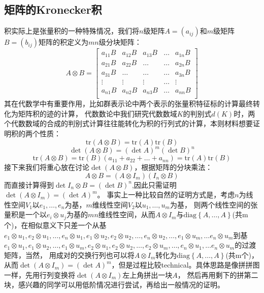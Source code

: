 \documentclass[a4paper,12pt]{ctexart}
\newenvironment{prooff}{{\noindent\it\textcolor{cyan!40!black}{Proof}:}\quad}{\par}
\begin{document}
\subsection{矩阵的Kronecker积}
积实际上是张量积的一种特殊情况，我们将$n$级矩阵$A=(a_{ij})$和$m$级矩阵$B=(b_{ij})$矩阵的积定义为$mn$级分块矩阵：
\begin{equation*}
    A\otimes B=\begin{bmatrix}
        a_{11}B & a_{12}B & a_{13}B & \dots & a_{1n}B \\
        a_{21}B & a_{22}B & \dots   & \dots & a_{2n}B \\
        a_{31}B & \dots   & \dots   & \dots & a_{3n}B \\
        \vdots  & \vdots  & \vdots  & \dots & \vdots  \\
        a_{n1}B & a_{n2}B & a_{n3}B & \dots & a_{nn}B \\
    \end{bmatrix}
\end{equation*}
其在代数学中有重要作用，比如群表示论中两个表示的张量积特征标的计算最终转化为矩阵积的迹的计算，
代数数论中我们研究代数数域$K$的判别式$d(K)$时，两个代数数域的合成的判别式计算往往能转化为积的行列式的计算，本则材料想要证明积的两个性质：
\begin{equation*}
    \text{tr}(A\otimes B)=\text{tr}(A)\text{tr}(B)
\end{equation*}
\begin{equation*}
    \det(A\otimes B)=(\det A)^{m}(\det B)^{n}
\end{equation*}
\begin{prooff}
    \begin{equation*}
        \text{tr}(A\otimes B)=\text{tr}(B)(a_{11}+a_{22}+\dots+a_{nn})=\text{tr}(A)\text{tr}(B)
    \end{equation*}
    接下来我们将重心放在讨论$\det(A\otimes B)$，根据矩阵的分块乘法：
    \begin{equation*}
        A\otimes B=(A\otimes I_m)(I_n\otimes B)
    \end{equation*}
    而直接计算得到$\det I_n\otimes B=(\det B)^{n}$,因此只需证明$\det(A\otimes I_m)=(\det A)^{m}$。
    事实上一种比较自然的证明方式是，考虑$n$为线性空间$V_1$以$e_1,\dots,e_n$为基，$m$维线性空间$V_2$以$u_1,\dots,u_m$为基，
    则两个线性空间的张量积是一个以$e_i\otimes u_j$为基的$mn$维线性空间，从而$A\otimes I_m$与$\text{diag}\left\{A,\dots,A\right\}$(共m个)，在相似意义下只差一个从基
    $e_1\otimes u_1,e_2\otimes u_1,\dots,e_n\otimes u_1,e_1\otimes u_2,e_2\otimes u_2,\dots,e_n\otimes u_2,\dots,e_1\otimes u_m,\dots e_n\otimes u_m$到基
    $e_1\otimes u_1,e_1\otimes u_2,\dots,e_1\otimes u_m,e_2\otimes u_1,e_2\otimes u_2,\dots,e_2\otimes u_m,\dots,e_n\otimes u_1,\dots e_n\otimes u_m$的过渡矩阵，当然，
    用成对的交换行列也可以将$A\otimes I_m$转化为$\text{diag}\left\{A,\dots,A\right\}$(共m个)，从而$\det(A\otimes I_m)=(\det A)^{m}$，但是过程比较technical。具体思路是像拼拼图一样，先用行列变换将$\det(A\otimes I_m)$左上角拼出一块$A$，
    然后再用剩下的拼第二块，感兴趣的同学可以用低阶情况进行尝试，再给出一般情况的证明。



\end{prooff}
\end{document}
